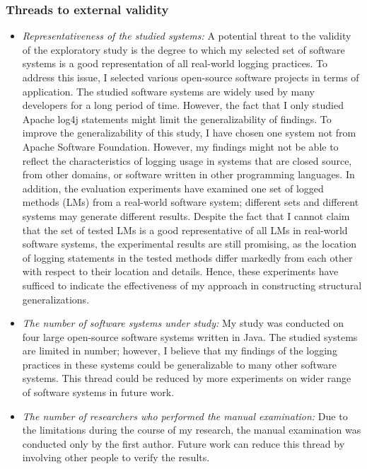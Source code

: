 \subsubsection{Threads to external validity}  \label{external_threads}
\begin{itemize} [leftmargin=.5in]
\item \textit{Representativeness of the studied systems:} A potential threat to the validity of the exploratory study is the degree to which my selected set of software systems is a good representation of all real-world logging practices. To address this issue, I selected various open-source software projects in terms of application. The studied software systems are widely used by many developers for a long period of time. However, the fact that I only studied Apache log4j statements might limit the generalizability of findings. To improve the generalizability of this study, I have chosen one system not from Apache Software Foundation. However, my findings might not be able to reflect the characteristics of logging usage in systems that are closed source, from other domains, or software written in other programming languages. In addition, the evaluation experiments have examined one set of logged methods (LMs) from a real-world software system; different sets and different systems may generate different results. Despite the fact that I cannot claim that the set of tested LMs is a good representative of all LMs in real-world software systems, the experimental results are still promising, as the location of logging statements in the tested methods differ markedly from each other with respect to their location and details. Hence, these experiments have sufficed to indicate the effectiveness of my approach in constructing structural generalizations.
\item \textit{The number of software systems under study:}	 My study was conducted on four large open-source software systems written in Java. The studied systems are limited in number; however, I believe that my findings of the logging practices in these systems could be generalizable to many other software systems. This thread could be reduced by more experiments on wider range of software systems in future work.
\item \textit{The number of researchers who performed the manual examination: }Due to the limitations during the course of my research, the manual examination was conducted only by the first author. Future work can reduce this thread by involving other people to verify the results.
\end{itemize}
 
